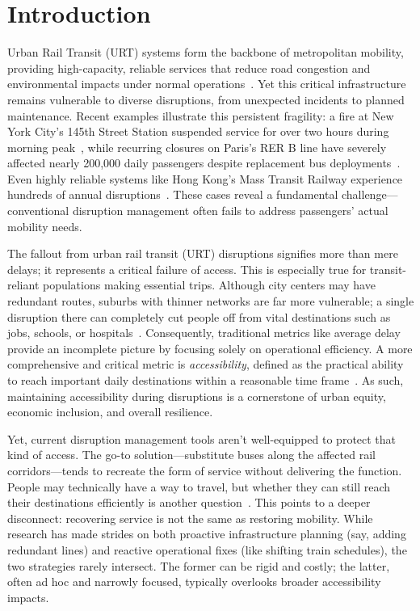 \documentclass[3p,times,procedia]{elsarticle}
\begin{document}
\vspace*{-12pt}
\section{Introduction}\label{sec:intro}

Urban Rail Transit (URT) systems form the backbone of metropolitan mobility, providing high-capacity, reliable services that reduce road congestion and environmental impacts under normal operations~\citep{tan2020evacuating}. Yet this critical infrastructure remains vulnerable to diverse disruptions, from unexpected incidents to planned maintenance. Recent examples illustrate this persistent fragility: a fire at New York City's 145th Street Station suspended service for over two hours during morning peak~\citep{barone2017abcdfire}, while recurring closures on Paris's RER B line have severely affected nearly 200,000 daily passengers despite replacement bus deployments~\citep{actu2024travaux}. Even highly reliable systems like Hong Kong's Mass Transit Railway experience hundreds of annual disruptions~\citep{zhang2020metro}. These cases reveal a fundamental challenge—conventional disruption management often fails to address passengers' actual mobility needs.

The fallout from urban rail transit (URT) disruptions signifies more than mere delays; it represents a critical failure of access. This is especially true for transit-reliant populations making essential trips. Although city centers may have redundant routes, suburbs with thinner networks are far more vulnerable; a single disruption there can completely cut people off from vital destinations such as jobs, schools, or hospitals~\citep{liu2024measuring}. Consequently, traditional metrics like average delay provide an incomplete picture by focusing solely on operational efficiency. A more comprehensive and critical metric is \emph{accessibility}, defined as the practical ability to reach important daily destinations within a reasonable time frame~\citep{miller2020measuring}. As such, maintaining accessibility during disruptions is a cornerstone of urban equity, economic inclusion, and overall resilience.

Yet, current disruption management tools aren’t well-equipped to protect that kind of access. The go-to solution—substitute buses along the affected rail corridors—tends to recreate the form of service without delivering the function. People may technically have a way to travel, but whether they can still reach their destinations efficiently is another question~\citep{ieda1995commuter}. This points to a deeper disconnect: recovering service is not the same as restoring mobility. While research has made strides on both proactive infrastructure planning (say, adding redundant lines) and reactive operational fixes (like shifting train schedules), the two strategies rarely intersect. The former can be rigid and costly; the latter, often ad hoc and narrowly focused, typically overlooks broader accessibility impacts.
\end{document}
